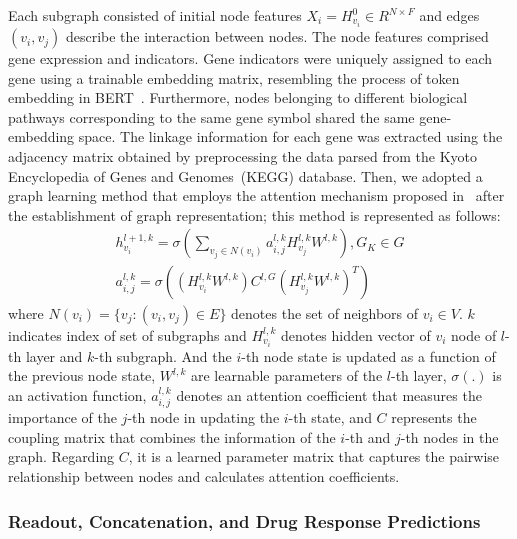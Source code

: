 \documentclass[runningheads]{llncs}
\begin{document}
Each subgraph consisted of initial node features $X_i = H_{v_i}^{0} \in R^{N \times F}$ and edges $(v_i, v_j)$ describe the interaction between nodes. The node features comprised gene expression and indicators. Gene indicators were uniquely assigned to each gene using a trainable embedding matrix, resembling the process of token embedding in BERT~\cite{7}. Furthermore, nodes belonging to different biological
pathways corresponding to the same gene symbol shared the same
gene-embedding space. The linkage information for each gene was
extracted using the adjacency matrix obtained by preprocessing the
data parsed from the Kyoto Encyclopedia of Genes and Genomes~(KEGG)
database. Then, we adopted a graph learning method that employs the
attention mechanism proposed in~\cite{28} after the establishment of graph representation; this method is represented as follows:
%
\begin{align}
h_{v_i}^{l+1, k} = \sigma \left( \sum_{v_j \in N(v_i)} a_{i,j}^{l, k} H_{v_j}^{l, k} W^{l, k}\right), G_K \in G\\
a_{i,j}^{l, k} = \sigma \left( (H_{v_i}^{l, k}W^{l, k}) C^{l, G} (H_{v_j}^{l, k}W^{l, k})^{T} \right)
\end{align}
%
where $N(v_i) = \{v_j: (v_i, v_j) \in E\}$ denotes the set of neighbors of $v_i \in V$. $k$ indicates index of set of subgraphs and $H_{v_i}^{l, k}$ denotes hidden vector of $v_i$ node of $l$-th layer and $k$-th subgraph. And the $i$-th node state is updated as a function of the previous node state, $W^{l, k}$ are learnable parameters of the $l$-th layer, $\sigma(.)$ is an activation function, $a_{i, j}^{l, k}$ denotes an attention coefficient that measures the importance of the $j$-th node in updating the $i$-th state, and $C$ represents the coupling matrix that combines the information of the $i$-th and $j$-th nodes in the graph. Regarding $C$, it is a learned parameter matrix that captures the pairwise relationship between nodes and calculates attention coefficients.

\subsubsection{Readout, Concatenation, and Drug Response Predictions}
\end{document}
